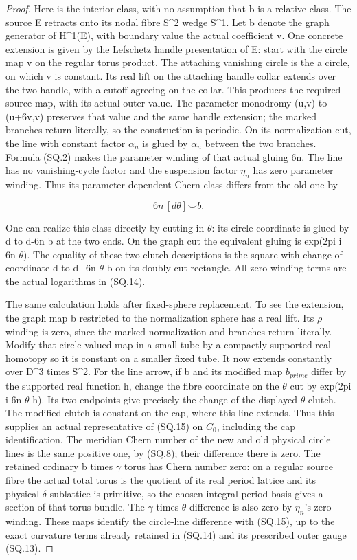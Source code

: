 \begin{proof}
Here is the interior class, with no assumption that b is a relative
class. The source E retracts onto its nodal fibre S\^{}2 wedge S\^{}1.
Let b denote the graph generator of H\^{}1(E), with boundary value the
actual coefficient v. One concrete extension is given by the Lefschetz
handle presentation of E: start with the circle map v on the regular
torus product. The attaching vanishing circle is the a circle, on
which v is constant. Its real lift on the attaching handle collar
extends over the two-handle, with a cutoff agreeing on the collar.
This produces the required source map, with its actual outer value.
The parameter monodromy (u,v) to (u+6v,v) preserves that value and
the same handle extension; the marked branches return literally,
so the construction is periodic. On its normalization cut,
the line with constant factor \(\alpha_{n}\) is glued by \(\alpha_{n}\) between the
two branches. Formula (SQ.2) makes the parameter winding of that
actual gluing 6n. The line has no vanishing-cycle factor and the
suspension factor \(\eta_{n}\) has zero parameter winding. Thus its
parameter-dependent Chern class differs from the old one by

\[
                         6n\,[d\theta]\smile b.         \tag{SQ.15}
\]

One can realize this class directly by cutting in \(\theta\): its circle
coordinate is glued by d to d-6n b at the two ends. On the graph cut
the equivalent gluing is exp(2pi i 6n \(\theta\)). The equality of these
two clutch descriptions is the square with change of coordinate
d to d+6n \(\theta\) b on its doubly cut rectangle. All zero-winding
terms are the actual logarithms in (SQ.14).

The same calculation holds after fixed-sphere replacement. To see the
extension, the graph map b restricted to the normalization sphere has
a real lift. Its \(\rho\) winding is zero, since the marked normalization
and branches return literally. Modify that circle-valued map in a
small tube by a compactly supported real homotopy so it is constant
on a smaller fixed tube. It now extends constantly over D\^{}3 times S\^{}2.
For the line arrow, if b and its modified map \(b_{prime}\) differ by the
supported real function h, change the fibre coordinate on the \(\theta\)
cut by exp(2pi i 6n \(\theta\) h). Its two endpoints give precisely the
change of the displayed \(\theta\) clutch. The modified clutch is constant
on the cap, where this line extends. Thus this supplies an actual
representative of (SQ.15) on \(C_{0}\), including the cap identification. The
meridian Chern number of the new and old physical circle lines is
the same positive one, by (SQ.8); their difference there is zero.
The retained ordinary b times \(\gamma\) torus has Chern number zero:
on a regular source fibre the actual total torus is the quotient of
its real period lattice and its physical \(\delta\) sublattice is primitive,
so the chosen integral period basis gives a section of that torus
bundle. The \(\gamma\) times \(\theta\) difference is also zero by \(\eta_{n}\)'s
zero winding. These maps identify the circle-line difference with
(SQ.15), up to the exact curvature terms already retained in (SQ.14)
and its prescribed outer gauge (SQ.13).


\end{proof}
